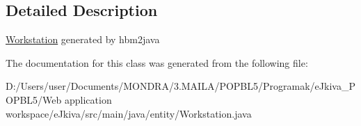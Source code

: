 \subsection{Detailed Description}
\mbox{\hyperlink{classentity_1_1_workstation}{Workstation}} generated by hbm2java 

The documentation for this class was generated from the following file\+:\begin{DoxyCompactItemize}
\item 
D\+:/\+Users/user/\+Documents/\+M\+O\+N\+D\+R\+A/3.\+M\+A\+I\+L\+A/\+P\+O\+P\+B\+L5/\+Programak/e\+Jkiva\+\_\+\+P\+O\+P\+B\+L5/\+Web application workspace/e\+Jkiva/src/main/java/entity/Workstation.\+java\end{DoxyCompactItemize}
